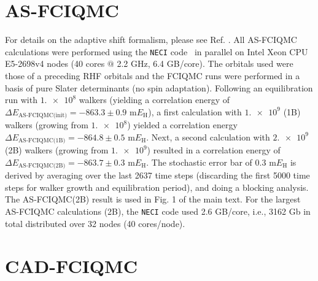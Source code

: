 \documentclass[journal=jcp,manuscript=suppinfo]{achemso}
\begin{document}
\section{AS-FCIQMC}\label{as_fciqmc_SI_sect}

For details on the adaptive shift formalism, please see Ref. . All AS-FCIQMC calculations were performed using the {\texttt{NECI}} code~\cite{neci,neci_jcp_2020} in parallel on Intel Xeon CPU E5-2698v4 nodes (40 cores $@$ 2.2 GHz, 6.4 GB/core). The orbitals used were those of a preceding RHF orbitals and the FCIQMC runs were performed in a basis of pure Slater determinants (no spin adaptation). Following an equilibration run with $\num{1.e8}$ walkers (yielding a correlation energy of $\Delta E_{\text{AS-FCIQMC(init)}} = -863.3\pm0.9$ m$E_{\text{H}}$), a first calculation with $\num{1.e9}$ (1B) walkers (growing from $\num{1.e8}$) yielded a correlation energy $\Delta E_{\text{AS-FCIQMC(1B)}} = -864.8\pm0.5$ m$E_{\text{H}}$. Next, a second calculation with $\num{2.e9}$ (2B) walkers (growing from $\num{1.e9}$) resulted in a correlation energy of $\Delta E_{\text{AS-FCIQMC(2B)}} = -863.7\pm0.3$ m$E_{\text{H}}$. The stochastic error bar of $0.3$ m$E_{\text{H}}$ is derived by averaging over the last 2637 time steps (discarding the first 5000 time steps for walker growth and equilibration period), and doing a blocking analysis. The AS‐FCIQMC(2B) result is used in Fig. 1 of the main text. For the largest AS-FCIQMC calculations (2B), the {\texttt{NECI}} code used 2.6 GB/core, i.e., 3162 Gb in total distributed over 32 nodes (40 cores/node).


\section{CAD-FCIQMC}
\label{cad_fciqmc_SI_sect}
\end{document}
